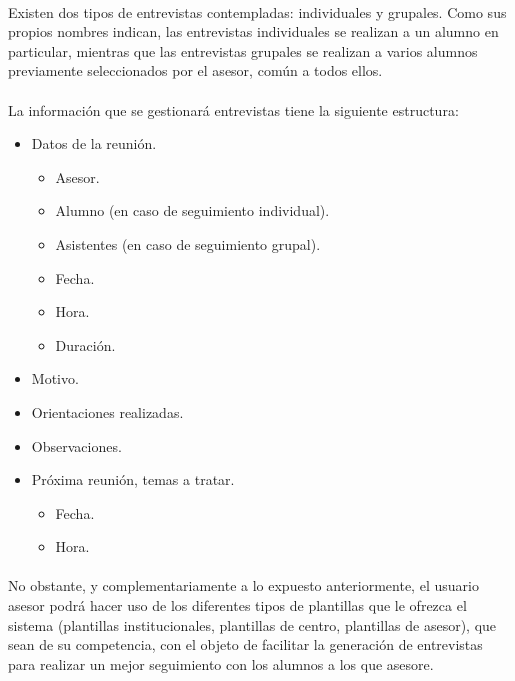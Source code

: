       \paragraph{}Existen dos tipos de entrevistas contempladas: individuales y
      grupales. Como sus propios nombres indican, las entrevistas individuales
      se realizan a un alumno en particular, mientras que las entrevistas
      grupales se realizan a varios alumnos previamente seleccionados por el
      asesor, común a todos ellos.

      \paragraph{}La información que se gestionará entrevistas tiene la
      siguiente estructura:

      \begin{itemize}
         \item Datos de la reunión.
         \begin{itemize}
            \item Asesor.
            \item Alumno (en caso de seguimiento individual).
            \item Asistentes (en caso de seguimiento grupal).
            \item Fecha.
            \item Hora.
            \item Duración.
         \end{itemize}
         \item Motivo.
         \item Orientaciones realizadas.
         \item Observaciones.
         \item Próxima reunión, temas a tratar.
         \begin{itemize}
            \item Fecha.
            \item Hora.
         \end{itemize}
      \end{itemize}

      \paragraph{}No obstante, y complementariamente a lo expuesto
      anteriormente, el usuario asesor podrá hacer uso de los diferentes tipos
      de plantillas que le ofrezca el sistema (plantillas institucionales,
      plantillas de centro, plantillas de asesor), que sean de su competencia,
      con el objeto de facilitar la generación de entrevistas para realizar un
      mejor seguimiento con los alumnos a los que asesore.

